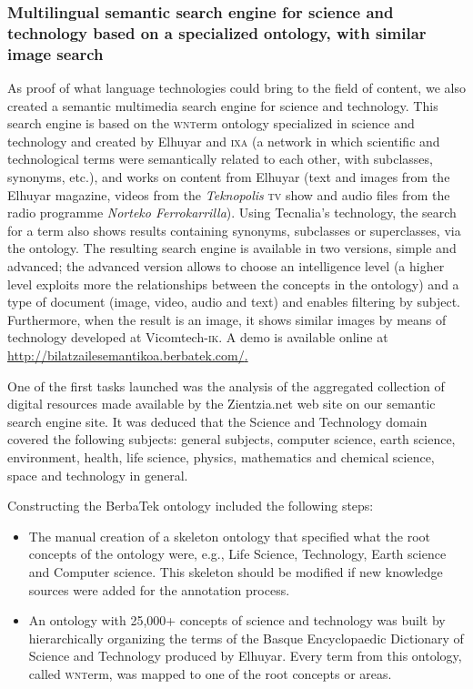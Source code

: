 \documentclass[output=paper]{LSP/langsci}
\begin{document}
\subsubsection{Multilingual semantic search engine for science and technology based on a specialized ontology, with similar image search}\label{sec:leturia:5.2.2}


As proof of what language technologies could bring to the field of content, we also created a semantic multimedia search engine for science and technology. This search engine is based on the \textsc{wnt}erm ontology \citep{PocielloEtAl2008} specialized in science and technology and created by Elhuyar and \textsc{ixa} (a network in which scientific and technological terms were semantically related to each other, with subclasses, synonyms, etc.), and works on content from Elhuyar (text and images from the Elhuyar magazine, videos from the \textit{Teknopolis} \textsc{tv} show and audio files from the radio programme \textit{Norteko Ferrokarrilla}). Using Tecnalia's technology, the search for a term also shows results containing synonyms, subclasses or superclasses, via the ontology. The resulting search engine is available in two versions, simple and advanced; the advanced version allows to choose an intelligence level (a higher level exploits more the relationships between the concepts in the ontology) and a type of document (image, video, audio and text) and enables filtering by subject. Furthermore, when the result is an image, it shows similar images by means of technology developed at Vicomtech-\textsc{ik}. A demo is available online at \url{http://bilatzailesemantikoa.berbatek.com/}\href{http://bilatzailesemantikoa.berbatek.com/}. 


One of the first tasks launched was the analysis of the aggregated collection of digital resources made available by the Zientzia.net web site on our semantic search engine site. It was deduced that the Science and Technology domain covered the following subjects: general subjects, computer science, earth science, environment, health, life science, physics, mathematics and chemical science, space and technology in general.

Constructing the BerbaTek ontology included the following steps:

\begin{itemize}
\item 
The manual creation of a skeleton ontology that specified what the root concepts of the ontology were, e.g., Life Science, Technology, Earth science and Computer science. This skeleton should be modified if new knowledge sources were added for the annotation process.

\newpage 
\item 
An ontology with 25,000+ concepts of science and technology was built by hierarchically organizing the terms of the Basque Encyclopaedic Dictionary of Science and Technology produced by Elhuyar. Every term from this ontology, called \textsc{wnt}erm, was mapped to one of the root concepts or areas.
\end{itemize}
\end{document}
